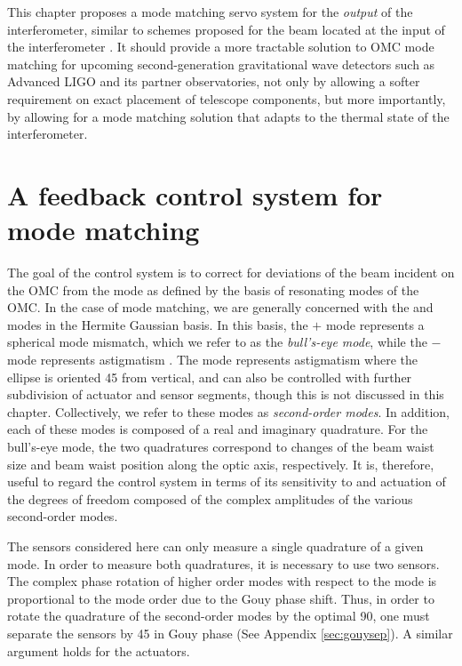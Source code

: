 This chapter proposes a mode matching servo system for the {\it output} of the interferometer, similar to schemes proposed for the beam located at the input of the interferometer \cite{Arain:10,Mueller:00}. %
It should provide a more tractable solution to OMC mode matching for upcoming second-generation gravitational wave detectors such as Advanced LIGO and its partner observatories, not only by allowing a softer requirement on exact placement of telescope components, but more importantly, by allowing for a mode matching solution that adapts to the thermal state of the interferometer.

\section{A feedback control system for mode matching}
The goal of the control system is to correct for deviations of the beam incident on the OMC from the  mode as defined by the basis of resonating modes of the OMC. %
In the case of mode matching, we are generally concerned with the  and  modes in the Hermite Gaussian basis. %
In this basis, the  $+$  mode represents a spherical mode mismatch, which we refer to as the \emph{bull's-eye mode}, while the  $-$  mode represents astigmatism \cite{Hefetz:97}. %
The  mode represents astigmatism where the ellipse is oriented 45\degrees{} from vertical, and can also be controlled with further subdivision of actuator and sensor segments, though this is not discussed in this chapter. %
Collectively, we refer to these modes as \emph{second-order modes}. %
In addition, each of these modes is composed of a real and imaginary quadrature. %
For the bull's-eye mode, the two quadratures correspond to changes of the beam waist size and beam waist position along the optic axis, respectively. %
It is, therefore, useful to regard the control system in terms of its sensitivity to and actuation of the degrees of freedom composed of the complex amplitudes of the various second-order modes.

The sensors considered here can only measure a single quadrature of a given mode. %
In order to measure both quadratures, it is necessary to use two sensors. %
The complex phase rotation of higher order modes with respect to the  mode is proportional to the mode order due to the Gouy phase shift. %
Thus, in order to rotate the quadrature of the second-order modes by the optimal 90\degrees{}, one must separate the sensors by 45\degrees{} in Gouy phase (See Appendix \ref{sec:gouysep}). %
A similar argument holds for the actuators.

